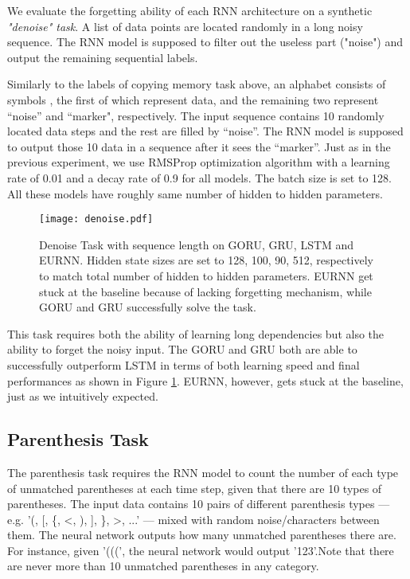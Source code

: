 \documentclass[letterpaper]{article} \usepackage{aaai18}  \usepackage{times}  \usepackage{helvet}  \usepackage{courier}  \usepackage{url}  \usepackage{graphicx}
\begin{document}
We evaluate the forgetting ability of each RNN architecture on a synthetic {\it "denoise" task}. A list of data points are located randomly in a long noisy sequence. The RNN model is supposed to filter out the useless part ("noise") and output the remaining sequential labels.

Similarly to the labels of copying memory task above,
an alphabet consists of symbols  , the first  of which represent data, and the remaining two represent ``noise'' and ``marker", respectively.
The input sequence contains 10 randomly located data steps and the rest are filled by ``noise''. The RNN model is supposed to output those 10 data in a sequence after it sees the ``marker''.
Just as in the previous experiment, we use RMSProp optimization algorithm with a learning rate of 0.01 and a decay rate of 0.9 for all models. The batch size is set to 128. All these models have roughly same number of hidden to hidden parameters.

\begin{figure}[h!]
\centering
\texttt{[image: denoise.pdf]}
\caption{Denoise Task with sequence length  on GORU, GRU, LSTM and EURNN.  Hidden state sizes are set to 128, 100, 90, 512, respectively to match total number of hidden to hidden parameters. EURNN get stuck at the baseline because of lacking forgetting mechanism, while GORU and GRU successfully solve the task.}
\label{fig:denoise}
\end{figure}

This task requires both the ability of learning long dependencies but also the ability to forget the noisy input. 
The GORU and GRU both are able to successfully outperform LSTM in terms of both learning speed and final performances as shown in Figure \ref{fig:denoise}. EURNN, however, gets stuck at the baseline, just as we intuitively expected.




\subsection{Parenthesis Task}

The parenthesis task\cite{foerster2016intelligible} requires the RNN model to count the number of each type of unmatched parentheses at each time step, given that there are 10 types of parentheses. The input data contains 10 pairs of different parenthesis types --- e.g. '(, [, \{, <, ), ], \}, >, ...' --- mixed with random noise/characters between them. The neural network outputs how many unmatched parentheses there are. For instance, given '(((', the neural network would output '123'.Note that there are never more than 10 unmatched parentheses in any category. 
\end{document}
